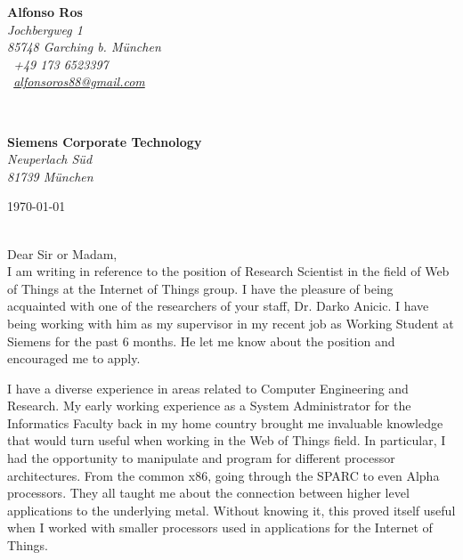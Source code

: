 \documentclass[11pt]{article}
\begin{document}
\sffamily   %
\hfill%
\begin{minipage}[t]{.6\textwidth}
\raggedleft%
{\bfseries Alfonso Ros}\\[.35ex]
\small\itshape%
Jochbergweg 1\\
85748 Garching b. M\"unchen\\[.35ex]
\Telefon~+49 173 6523397\\
\Letter~\href{mailto:alfonso.ros.88@gmail.com}{alfonsoros88@gmail.com}

\end{minipage}\\[1em]
%
\begin{minipage}[t]{.4\textwidth}
\raggedright%
{\bfseries Siemens Corporate Technology}\\[.35ex]
\small\itshape%
Neuperlach S\"ud\\
81739 M\"unchen
\end{minipage}
\hfill %
\begin{minipage}[t]{.4\textwidth}
\raggedleft %
\today
\end{minipage}\\[2em]

Dear Sir or Madam,\\[.5em]

I am writing in reference to the position of Research Scientist in the field of 
Web of Things at the Internet of Things group. I have the pleasure of being 
acquainted with one of the researchers of your staff, Dr. Darko Anicic. I have 
being working with him as my supervisor in my recent job as Working Student at 
Siemens for the past 6 months. He let me know about the position and encouraged
me to apply.

I have a diverse experience in areas related to Computer Engineering and 
Research. My early working experience as a System Administrator for the 
Informatics Faculty back in my home country brought me invaluable knowledge 
that would turn useful when working in the Web of Things field. In particular,
I had the opportunity to manipulate and program for different processor
architectures. From the common x86, going through the SPARC to even 
Alpha processors. They all taught me about the connection between higher level 
applications to the underlying metal. Without knowing it, this proved 
itself useful when I worked with smaller processors used in applications for
the Internet of Things.
\end{document}
